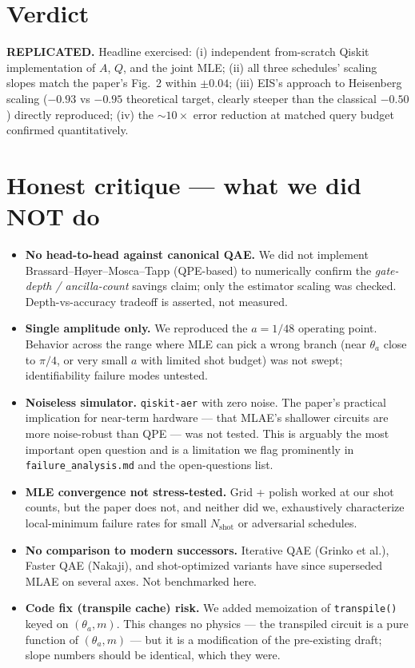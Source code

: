 \documentclass[11pt]{article}
\begin{document}
\section{Verdict}
\textbf{REPLICATED.}  Headline exercised: (i) independent from-scratch Qiskit
implementation of $A$, $Q$, and the joint MLE; (ii) all three schedules'
scaling slopes match the paper's Fig.\ 2 within $\pm 0.04$; (iii) EIS's
approach to Heisenberg scaling ($-0.93$ vs $-0.95$ theoretical target,
clearly steeper than the classical $-0.50$) directly reproduced; (iv) the
$\sim 10\times$ error reduction at matched query budget confirmed
quantitatively.

\section{Honest critique --- what we did NOT do}
\begin{itemize}
  \item \textbf{No head-to-head against canonical QAE.} We did not implement
        Brassard--H\o yer--Mosca--Tapp (QPE-based) to numerically confirm the
        \emph{gate-depth / ancilla-count} savings claim; only the estimator
        scaling was checked.  Depth-vs-accuracy tradeoff is asserted, not
        measured.
  \item \textbf{Single amplitude only.} We reproduced the $a=1/48$ operating
        point.  Behavior across the range where MLE can pick a wrong branch
        (near $\theta_a$ close to $\pi/4$, or very small $a$ with limited
        shot budget) was not swept; identifiability failure modes untested.
  \item \textbf{Noiseless simulator.} \texttt{qiskit-aer} with zero noise.
        The paper's practical implication for near-term hardware --- that
        MLAE's shallower circuits are more noise-robust than QPE --- was
        not tested.  This is arguably the most important open question and
        is a limitation we flag prominently in \texttt{failure\_analysis.md}
        and the open-questions list.
  \item \textbf{MLE convergence not stress-tested.} Grid + polish worked at
        our shot counts, but the paper does not, and neither did we,
        exhaustively characterize local-minimum failure rates for small
        $N_{\text{shot}}$ or adversarial schedules.
  \item \textbf{No comparison to modern successors.} Iterative QAE (Grinko
        et al.), Faster QAE (Nakaji), and shot-optimized variants have since
        superseded MLAE on several axes.  Not benchmarked here.
  \item \textbf{Code fix (transpile cache) risk.} We added memoization of
        \texttt{transpile()} keyed on $(\theta_a, m)$.  This changes no
        physics --- the transpiled circuit is a pure function of
        $(\theta_a, m)$ --- but it is a modification of the pre-existing
        draft; slope numbers should be identical, which they were.
\end{itemize}
\end{document}
